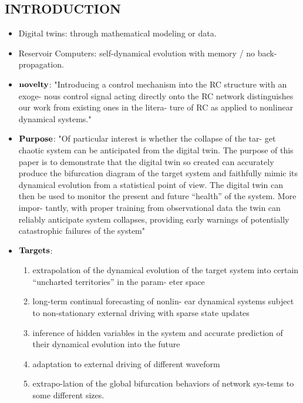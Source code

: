 \subsection{INTRODUCTION}
\begin{itemize}
    \item Digital twins: through mathematical modeling or data.
    \item Reservoir Computers: self-dynamical evolution with memory / no back-propagation.
    \item $\bold{novelty}$: "Introducing a
    control mechanism into the RC structure with an exoge-
    nous control signal acting directly onto the RC network
    distinguishes our work from existing ones in the litera-
    ture of RC as applied to nonlinear dynamical systems."
    \item $\bold{Purpose}$: "Of particular interest is whether the collapse of the tar-
    get chaotic system can be anticipated from the digital
    twin. The purpose of this paper is to demonstrate that
    the digital twin so created can accurately produce the
    bifurcation diagram of the target system and faithfully
    mimic its dynamical evolution from a statistical point of
    view. The digital twin can then be used to monitor the
    present and future “health” of the system. More impor-
    tantly, with proper training from observational data the
    twin can reliably anticipate system collapses, providing
    early warnings of potentially catastrophic failures of the
    system"
    \item $\bold{Targets}$: \begin{enumerate}
        \item extrapolation of the dynamical evolution of the target
        system into certain “uncharted territories” in the param-
        eter space
        \item long-term continual forecasting of nonlin-
        ear dynamical systems subject to non-stationary external
        driving with sparse state updates
        \item inference of hidden variables in the system and accurate prediction of their dynamical evolution into the future
        \item adaptation to external driving of diﬀerent waveform
        \item extrapo-lation of the global bifurcation behaviors of network sys-tems to some diﬀerent sizes. 
    \end{enumerate}
\end{itemize}

\clearpage
